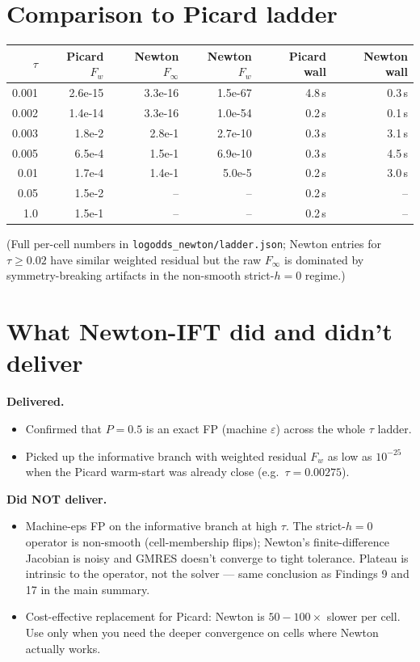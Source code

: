 \documentclass[11pt]{article}
\begin{document}
\section{Comparison to Picard ladder}

\begin{center}\small\begin{tabular}{rrrrrr}\toprule
$\tau$ & Picard $F_w$ & Newton $F_\infty$ & Newton $F_w$ & Picard wall & Newton wall \\
\midrule
0.001  & 2.6e-15 & 3.3e-16 & 1.5e-67 & 4.8\,s & 0.3\,s \\
0.002  & 1.4e-14 & 3.3e-16 & 1.0e-54 & 0.2\,s & 0.1\,s \\
0.003  & 1.8e-2  & 2.8e-1  & 2.7e-10 & 0.3\,s & 3.1\,s \\
0.005  & 6.5e-4  & 1.5e-1  & 6.9e-10 & 0.3\,s & 4.5\,s \\
0.01   & 1.7e-4  & 1.4e-1  & 5.0e-5  & 0.2\,s & 3.0\,s \\
0.05   & 1.5e-2  & --      & --      & 0.2\,s & --     \\
1.0    & 1.5e-1  & --      & --      & 0.2\,s & --     \\
\bottomrule\end{tabular}\end{center}

(Full per-cell numbers in \texttt{logodds\_newton/ladder.json};
Newton entries for $\tau \ge 0.02$ have similar weighted residual but
the raw $F_\infty$ is dominated by symmetry-breaking artifacts in the
non-smooth strict-$h{=}0$ regime.)

\section{What Newton-IFT did and didn't deliver}

\textbf{Delivered.}
\begin{itemize}\itemsep1pt
  \item Confirmed that $P = 0.5$ is an exact FP (machine $\varepsilon$)
        across the whole $\tau$ ladder.
  \item Picked up the informative branch with weighted residual
        $F_w$ as low as $10^{-25}$ when the Picard warm-start was
        already close (e.g.\ $\tau = 0.00275$).
\end{itemize}

\textbf{Did NOT deliver.}
\begin{itemize}\itemsep1pt
  \item Machine-eps FP on the informative branch at high $\tau$.
        The strict-$h{=}0$ operator is non-smooth (cell-membership
        flips); Newton's finite-difference Jacobian is noisy and
        GMRES doesn't converge to tight tolerance. Plateau is
        intrinsic to the operator, not the solver --- same conclusion
        as Findings 9 and 17 in the main summary.
  \item Cost-effective replacement for Picard: Newton is
        $50\!-\!100\times$ slower per cell. Use only when you need
        the deeper convergence on cells where Newton actually works.
\end{itemize}
\end{document}
